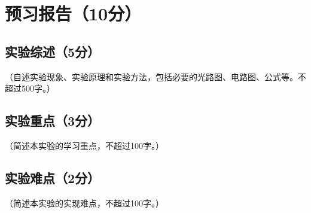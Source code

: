 \documentclass{Preport}
\begin{document}
\setcounter{page}{1}
\makecover

\section{预习报告（10分）}
\subsection{实验综述（5分）}
（自述实验现象、实验原理和实验方法，包括必要的光路图、电路图、公式等。不超过500字。）

\subsection{实验重点（3分）}
（简述本实验的学习重点，不超过100字。）

\subsection{实验难点（2分）}
（简述本实验的实现难点，不超过100字。）


\end{document}
